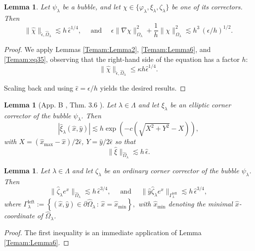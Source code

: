 \documentclass{article}
\newtheorem{lemma}[thm]{Lemma}
\newcommand{\Gammaleft}{\ensuremath{\Gamma_\lambda^{\text{left}}}\xspace}
\begin{document}
\begin{appendix}
\begin{lemma}\label{Temam:BubbleCorrectorsBound}
Let $\psi_\lambda$ be a bubble, and let $\chi \in\{\varphi_\lambda,\xi_\lambda,\zeta_\lambda\}$ be one of its correctors. Then
\[
\|\hat{\chi}\|_{\hat{\epsilon},\hat{\Omega}_\lambda}\lesssim h \, \hat{\epsilon}^{1/4},
\quad \text{ and }\quad
\epsilon \|\nabla\chi\|_{{\Omega}_\lambda}^2 + \frac{1}{h}\|\chi\|_{{\Omega}_\lambda}^2 \lesssim h^3 \,(\epsilon/h)^{1/2}.
\]
\end{lemma}

\begin{proof}
We apply Lemmas \ref{Temam:Lemma2}, \ref{Temam:Lemma6}, and \ref{Temam:eq35}, observing that the right-hand side of the equation has a factor $h$:
\[
\|\hat{\chi}\|_{\hat{\epsilon},\hat{\Omega}_\lambda
}\leq \kappa h \hat{\epsilon}^{1/4}.
\]

Scaling back and using $\hat{\epsilon}=\epsilon/h$ yields the desired results.
\end{proof}


\begin{lemma}[App. B \cite{GieEtAl:13}, Thm. 3.6 \cite{ShihKellogg:87}]\label{Temam:Ap}
Let $\lambda \in \Lambda$ and let $\xi_\lambda$ be an elliptic corner corrector of the bubble $\psi_\lambda$. Then 
$$
|\hat{\xi}_\lambda(\hat{x},\hat{y})| \lesssim h\exp(-c(\sqrt{X^2 + Y^2} -X)),
$$
with $X=(\hat x_{\text{max}}-\hat{x})/2\hat{\epsilon}$, $Y=\hat{y}/2\hat{\epsilon}$ so that
\begin{equation}\label{Eq:Xi}
\|\hat{\xi}\|_{\hat{\Omega}_\lambda} \lesssim h\,\hat{\epsilon}.
\end{equation}
\end{lemma}
\begin{lemma}\label{Temam:zetaBubble}
Let $\lambda \in \Lambda$ and let $\zeta
_\lambda$ be an ordinary corner corrector of the bubble $\psi_\lambda$. Then
$$
\|\hat{\zeta}_\lambda e^x\|_{\hat{\Omega}_\lambda} \lesssim h \,\hat{\epsilon}^{3/4},
\quad \text{ and }\quad
\|\hat{y}\hat{\zeta}_\lambda e^x\|_{\Gammaleft} \lesssim h \,\hat{\epsilon}^{3/4},
$$
where \(\Gammaleft := \left\{ (\hat{x}, \hat{y}) \in \partial \hat{\Omega}_\lambda \,:\, \hat{x} = \hat x_{\min} \right\},
\)
with $\hat x_{\min}$ denoting the minimal $\hat{x}$-coordinate of $\hat{\Omega}_\lambda$.
\end{lemma}

\begin{proof}
 The first inequality is an immediate application of Lemma \ref{Temam:Lemma6}.
 

\end{proof}
\end{appendix}
\end{document}

